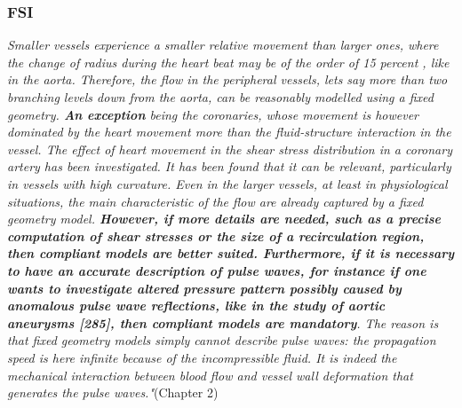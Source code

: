 \documentclass[11pt,letterpaper]{article}
\begin{document}
\subsubsection*{FSI} \textit{Smaller vessels experience a smaller relative movement than larger ones, where the change of radius during the heart beat may be of the order of 15 percent , like in the aorta. Therefore, the flow in the peripheral vessels, lets say more than two branching levels down from the aorta, can be reasonably modelled using a fixed geometry. \textbf{An exception} being the coronaries, whose movement is however dominated by the heart movement more than the fluid-structure interaction in the vessel. The effect of heart movement in the shear stress distribution in a coronary artery has been investigated. It has been found that it can be relevant, particularly in vessels with high curvature. Even in the larger vessels, at least in physiological situations, the main
characteristic of the flow are already captured by a fixed geometry model. \textbf{However, if more details are needed, such as a precise computation of shear stresses or the size of a recirculation region, then compliant models are better suited. Furthermore, if it is necessary to have an accurate description of pulse waves, for instance if one wants to investigate altered pressure pattern possibly caused by anomalous pulse wave reflections, like in the study of aortic aneurysms [285], then compliant models are mandatory}. The reason is that fixed geometry models simply cannot describe pulse waves: the propagation speed is here infinite because of the incompressible fluid. It is indeed the mechanical interaction between blood flow and vessel wall deformation that generates the pulse waves."}(Chapter 2)
\end{document}
